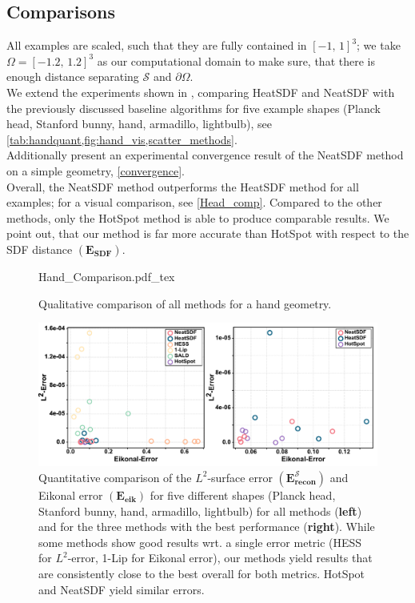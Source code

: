 \documentclass[12pt,openany]{book}
\theoremstyle{plainnormal}
\theoremstyle{remark}
\begin{document}
\subsection{Comparisons}
All examples are scaled, such that they are fully contained in $[-1,\,1]^3$; we take $\Omega = [-1.2, \,1.2]^3$ as our computational domain to make sure, that there is enough distance separating $\mathcal S$ and $\partial \Omega$. \\
We extend the experiments shown in \cite{weidemaier2025sdfsunorientedpointclouds}, comparing HeatSDF and NeatSDF with the previously discussed baseline algorithms for five example shapes (Planck head, Stanford bunny, hand, armadillo, lightbulb), see \cref{tab:handquant,fig:hand_vis,scatter_methods}. \\
Additionally present an experimental convergence result of the NeatSDF method on a simple geometry, \cref{convergence}. \\
Overall, the NeatSDF method outperforms the HeatSDF method for all examples; for a visual comparison, see \cref{Head_comp}. Compared to the other methods, only the HotSpot method is able to produce comparable results. We point out, that our method is far more accurate than HotSpot with respect to the SDF distance $\mathbf {(E_{SDF})}$.
\begin{figure}[t]
    \centering
    \begingroup
    \sffamily
    \def\svgwidth{0.95\textwidth} %
    {Hand_Comparison.pdf_tex}
    \endgroup
    \caption{Qualitative comparison of all methods for a hand geometry.}
    \label{fig:hand_vis}
\end{figure}
\begin{figure}[b]
    \centering
    \includegraphics[width =\textwidth]{Figures/method_comparison_lager_letters.pdf}
    
   
    \caption{Quantitative comparison of the $L^2$-surface error $\mathbf{(E_{recon}^{\mathcal{S}})}$ and Eikonal error $\mathbf{(E_{\text{eik}})}$ for five different shapes (Planck head, Stanford bunny, hand, armadillo, lightbulb) for all methods (\textbf{left}) and for the three methods with the best performance (\textbf{right}). While some methods show good results wrt. a single error metric (HESS for $L^2$-error, 1-Lip for Eikonal error), our methods yield results that are consistently close to the best overall for both metrics. HotSpot and NeatSDF yield similar errors.}  \label{scatter_methods}
\end{figure}
\end{document}
